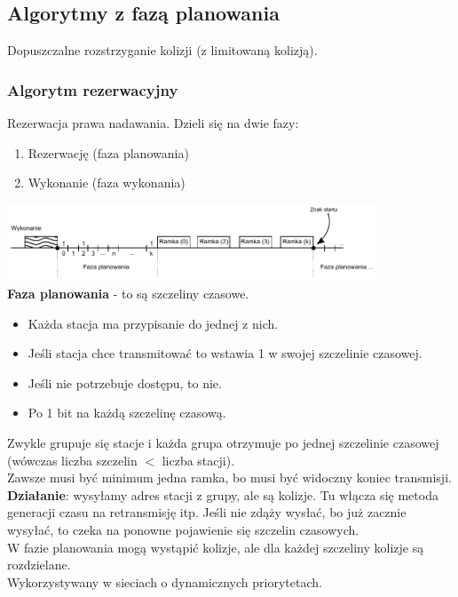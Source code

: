 		\subsection{Algorytmy z fazą planowania}
			Dopuszczalne rozstrzyganie kolizji (z limitowaną kolizją).
			\subsubsection{Algorytm rezerwacyjny}
				Rezerwacja prawa nadawania. Dzieli się na dwie fazy:
				\begin{enumerate}
					\item Rezerwację (faza planowania)
					\item Wykonanie (faza wykonania)
				\end{enumerate}
				\includegraphics[width=11cm]{./images/image25.pdf}\\
				\textbf{Faza planowania} - to są szczeliny czasowe.
				\begin{itemize}
					\item Każda stacja ma przypisanie do jednej z nich.
					\item Jeśli stacja chce transmitować to wstawia 1 w swojej szczelinie czasowej.
					\item Jeśli nie potrzebuje dostępu, to nie.
					\item Po 1 bit na każdą szczelinę czasową.
				\end{itemize}
				Zwykle grupuje się stacje i każda grupa otrzymuje po jednej szczelinie czasowej (wówczas liczba szczelin $ < $ liczba stacji).\\
				Zawsze musi być minimum jedna ramka, bo musi być widoczny koniec transmisji.\\
				\textbf{Działanie}: wysyłamy adres stacji z grupy, ale są kolizje. Tu włącza się metoda generacji czasu na retransmisję itp. Jeśli nie zdąży wysłać, bo już zacznie wysyłać, to czeka na ponowne pojawienie się szczelin czasowych.\\
				W fazie planowania mogą wystąpić kolizje, ale dla każdej szczeliny kolizje są rozdzielane.\\
				Wykorzystywany w sieciach o dynamicznych priorytetach.
